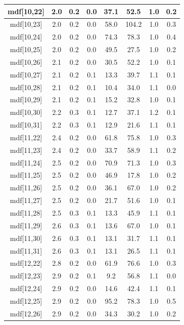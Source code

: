 \begin{longtable}{|c|c|c|c|c|c|c|c|}
\hline
mdf[10,22] & 2.0 & 0.2 & 0.0 & 37.1 & 52.5 & 1.0 & 0.2 \\
\hline
mdf[10,23] & 2.0 & 0.2 & 0.0 & 58.0 & 104.2 & 1.0 & 0.3 \\
\hline
mdf[10,24] & 2.0 & 0.2 & 0.0 & 74.3 & 78.3 & 1.0 & 0.4 \\
\hline
mdf[10,25] & 2.0 & 0.2 & 0.0 & 49.5 & 27.5 & 1.0 & 0.2 \\
\hline
mdf[10,26] & 2.1 & 0.2 & 0.0 & 30.5 & 52.2 & 1.0 & 0.1 \\
\hline
mdf[10,27] & 2.1 & 0.2 & 0.1 & 13.3 & 39.7 & 1.1 & 0.1 \\
\hline
mdf[10,28] & 2.1 & 0.2 & 0.1 & 10.4 & 34.0 & 1.1 & 0.0 \\
\hline
mdf[10,29] & 2.1 & 0.2 & 0.1 & 15.2 & 32.8 & 1.0 & 0.1 \\
\hline
mdf[10,30] & 2.2 & 0.3 & 0.1 & 12.7 & 37.1 & 1.2 & 0.1 \\
\hline
mdf[10,31] & 2.2 & 0.3 & 0.1 & 12.9 & 21.6 & 1.1 & 0.1 \\
\hline
mdf[11,22] & 2.4 & 0.2 & 0.0 & 61.8 & 75.8 & 1.0 & 0.3 \\
\hline
mdf[11,23] & 2.4 & 0.2 & 0.0 & 33.7 & 58.9 & 1.1 & 0.2 \\
\hline
mdf[11,24] & 2.5 & 0.2 & 0.0 & 70.9 & 71.3 & 1.0 & 0.3 \\
\hline
mdf[11,25] & 2.5 & 0.2 & 0.0 & 46.9 & 17.8 & 1.0 & 0.2 \\
\hline
mdf[11,26] & 2.5 & 0.2 & 0.0 & 36.1 & 67.0 & 1.0 & 0.2 \\
\hline
mdf[11,27] & 2.5 & 0.2 & 0.0 & 21.7 & 51.6 & 1.0 & 0.1 \\
\hline
mdf[11,28] & 2.5 & 0.3 & 0.1 & 13.3 & 45.9 & 1.1 & 0.1 \\
\hline
mdf[11,29] & 2.6 & 0.3 & 0.1 & 13.6 & 67.0 & 1.0 & 0.1 \\
\hline
mdf[11,30] & 2.6 & 0.3 & 0.1 & 13.1 & 31.7 & 1.1 & 0.1 \\
\hline
mdf[11,31] & 2.6 & 0.3 & 0.1 & 13.1 & 26.5 & 1.1 & 0.1 \\
\hline
mdf[12,22] & 2.8 & 0.2 & 0.0 & 61.9 & 76.6 & 1.0 & 0.3 \\
\hline
mdf[12,23] & 2.9 & 0.2 & 0.1 & 9.2 & 56.8 & 1.1 & 0.0 \\
\hline
mdf[12,24] & 2.9 & 0.2 & 0.0 & 14.6 & 42.4 & 1.1 & 0.1 \\
\hline
mdf[12,25] & 2.9 & 0.2 & 0.0 & 95.2 & 78.3 & 1.0 & 0.5 \\
\hline
mdf[12,26] & 2.9 & 0.2 & 0.0 & 34.3 & 30.2 & 1.0 & 0.2 \\

\end{longtable}
